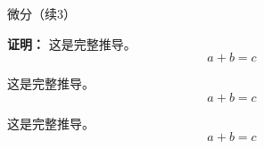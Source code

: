 \documentclass[aspectratio=169,10pt,fontset=fandol]{ctexbeamer}
\newenvironment{proofdetail}{\par\noindent\textbf{证明：}\quad}{\par}
\begin{document}
\begin{frame}[t,fragile]{微分（续3）}
\small
{\small
\begin{extra}\begin{proofdetail}
这是完整推导。\[a+b=c\]

这是完整推导。\[a+b=c\]

这是完整推导。\[a+b=c\]

\end{proofdetail}\end{extra}
}
\end{frame}
\end{document}
